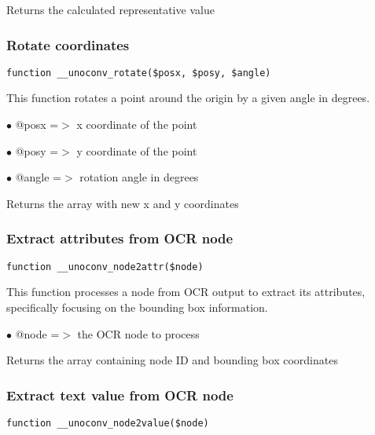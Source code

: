 \documentclass[a4paper]{article}
\begin{document}
Returns the calculated representative value

\hypertarget{toc542}{}
\subsubsection{Rotate coordinates}

\begin{lstlisting}
function __unoconv_rotate($posx, $posy, $angle)
\end{lstlisting}

This function rotates a point around the origin by a given angle in degrees.

\begin{compactitem}
\item[\color{myblue}$\bullet$] @posx  =$>$ x coordinate of the point
\item[\color{myblue}$\bullet$] @posy  =$>$ y coordinate of the point
\item[\color{myblue}$\bullet$] @angle =$>$ rotation angle in degrees
\end{compactitem}

Returns the array with new x and y coordinates

\hypertarget{toc543}{}
\subsubsection{Extract attributes from OCR node}

\begin{lstlisting}
function __unoconv_node2attr($node)
\end{lstlisting}

This function processes a node from OCR output to extract its attributes,
specifically focusing on the bounding box information.

\begin{compactitem}
\item[\color{myblue}$\bullet$] @node =$>$ the OCR node to process
\end{compactitem}

Returns the array containing node ID and bounding box coordinates

\hypertarget{toc544}{}
\subsubsection{Extract text value from OCR node}

\begin{lstlisting}
function __unoconv_node2value($node)
\end{lstlisting}
\end{document}
